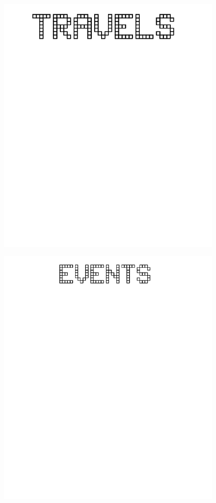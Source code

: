 \documentclass[17pt]{extreport}
\begin{document}
	 \begin{figure}
		\centering
		\includegraphics[width=6.25in]{imageserver/uploadimages/travels.png}
	\end{figure}
	\begin{figure}
		\centering
		\includegraphics[width=7.75in]{imageserver/uploadimages/events.png}
	\end{figure}	
\end{document}
